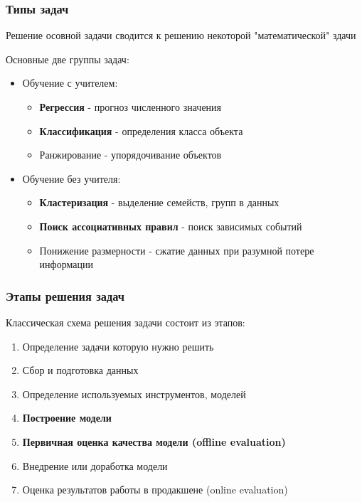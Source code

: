\documentclass{beamer}
\begin{document}
	
	\begin{frame}
		\frametitle{Типы задач}
		Решение осовной задачи сводится к решению некоторой "математической" здачи
		\vspace{10pt}
		
		Основные две группы задач: 
		
		\begin{itemize}
			\item Обучение с учителем:
			\begin{itemize}
				\item \textbf{Регрессия} - прогноз численного значения 
				\item \textbf{Классификация} - определения класса объекта
				\item Ранжирование - упорядочивание объектов
			\end{itemize}
		
			\item Обучение без учителя:
			\begin{itemize}
				\item \textbf{Кластеризация} - выделение семейств, групп в данных
				\item \textbf{Поиск ассоциативных правил} - поиск зависимых событий
				\item Понижение размерности - сжатие данных при разумной 
				потере информации
			\end{itemize}
		\end{itemize}
	\end{frame}

	
	\begin{frame}
		\frametitle{Этапы решения задач}
		Классическая схема решения задачи состоит из этапов:
		\begin{enumerate}
			\item Определение задачи которую нужно решить
			\item Сбор и подготовка данных
			\item Определение используемых инструментов, моделей
			\item \textbf{Построение модели}
			\item \textbf{Первичная оценка качества модели (offline evaluation)}
			\item Внедрение или доработка модели
			\item Оценка результатов работы в продакшене (online evaluation)
			
		\end{enumerate}
	\end{frame}
	
\end{document}
